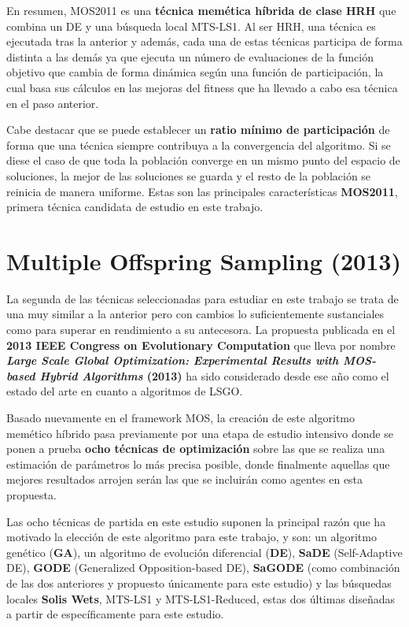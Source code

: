En resumen, MOS2011 es una \textbf{técnica memética híbrida de clase HRH} que combina un DE y una búsqueda local MTS-LS1. Al ser HRH, una técnica es ejecutada tras la anterior y además, cada una de estas técnicas participa de forma distinta a las demás ya que ejecuta un número de evaluaciones de la función objetivo que cambia de forma dinámica según una función de participación, la cual basa sus cálculos en las mejoras del fitness que ha llevado a cabo esa técnica en el paso anterior. 

Cabe destacar que se puede establecer un \textbf{ratio mínimo de participación} de forma que una técnica siempre contribuya a la convergencia del algoritmo. Si se diese el caso de que toda la población converge en un mismo punto del espacio de soluciones, la mejor de las soluciones se guarda y el resto de la población se reinicia de manera uniforme. Estas son las principales características \textbf{MOS2011}, primera técnica candidata de estudio en este trabajo.

\section{Multiple Offspring Sampling (2013)}

La segunda de las técnicas seleccionadas para estudiar en este trabajo se trata de una muy similar a la anterior pero con cambios lo suficientemente sustanciales como para superar en rendimiento a su antecesora. La propuesta publicada en el \textbf{2013 IEEE Congress on Evolutionary Computation} que lleva por nombre \textbf{\textit{Large Scale Global Optimization: Experimental Results with MOS-based Hybrid Algorithms} (2013)}\cite{MOS2013} ha sido considerado desde ese año como el estado del arte en cuanto a algoritmos de LSGO.

Basado nuevamente en el framework MOS, la creación de este algoritmo memético híbrido pasa previamente por una etapa de estudio intensivo donde se ponen a prueba \textbf{ocho técnicas de optimización} sobre las que se realiza una estimación de parámetros lo más precisa posible, donde finalmente aquellas que mejores resultados arrojen serán las que se incluirán como agentes en esta propuesta.

Las ocho técnicas de partida en este estudio suponen la principal razón que ha motivado la elección de este algoritmo para este trabajo, y son: un algoritmo genético (\textbf{GA}), un algoritmo de evolución diferencial (\textbf{DE}\cite{DE}), \textbf{SaDE}\cite{SaDE} (Self-Adaptive DE), \textbf{GODE}\cite{GODE} (Generalized Opposition-based DE), \textbf{SaGODE} (como combinación de las dos anteriores y propuesto únicamente para este estudio) y las búsquedas locales \textbf{Solis Wets}\cite{SolisWets}, MTS-LS1 y MTS-LS1-Reduced, estas dos últimas diseñadas a partir de \cite{MTS-LSGO} específicamente para este estudio. 

